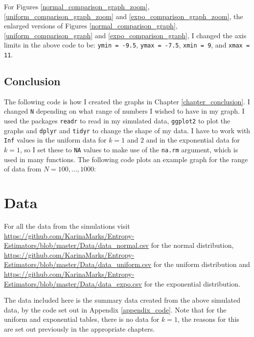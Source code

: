 \documentclass[12pt]{report}
\begin{document}
\begin{appendix}


For Figures \ref{normal_comparison_graph_zoom}, \ref{uniform_comparison_graph_zoom} and \ref{expo_comparison_graph_zoom}, the enlarged versions of Figures \ref{normal_comparison_graph}, \ref{uniform_comparison_graph} and \ref{expo_comparison_graph}, I changed the axis limits in the above code to be: \texttt{ymin = -9.5}, \texttt{ymax = -7.5}, \texttt{xmin = 9}, and \texttt{xmax = 11}.



\section{Conclusion}

The following code is how I created the graphs in Chapter \ref{chapter_conclusion}. I changed \texttt{N} depending on what range of numbers I wished to have in my graph. I used the packages \texttt{readr} to read in my simulated data, \texttt{ggplot2} to plot the graphs and \texttt{dplyr} and \texttt{tidyr} to change the shape of my data. I have to work with \texttt{Inf} values in the uniform data for $k=1$ and $2$ and in the exponential data for $k=1$, so I set these to \texttt{NA} values to make use of the \texttt{na.rm} argument, which is used in many functions. The following code plots an example graph for the range of data from $N=100,..., 1000$:






\chapter{Data} \label{appendix_data}

For all the data from the simulations visit \url{https://github.com/KarinaMarks/Entropy-Estimators/blob/master/Data/data_normal.csv} for the normal distribution, \url{https://github.com/KarinaMarks/Entropy-Estimators/blob/master/Data/data_uniform.csv} for the uniform distribution and \url{https://github.com/KarinaMarks/Entropy-Estimators/blob/master/Data/data_expo.csv} for the exponential distribution. 

The data included here is the summary data created from the above simulated data, by the code set out in Appendix \ref{appendix_code}. Note that for the uniform and exponential tables, there is no data for $k=1$, the reasons for this are set out previously in the appropriate chapters.


\end{appendix}
\end{document}
